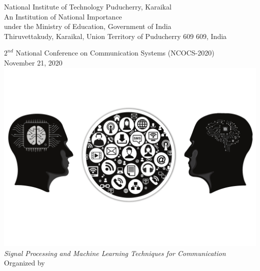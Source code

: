 \documentclass[12pt]{article}
\begin{document}
  

		{
			

	\begin{center}
		\thispagestyle{empty}	
		\onehalfspacing
		{\large National Institute of Technology Puducherry, Karaikal}\\
		{An Institution of National Importance}\\ \vspace{-0.25cm}
		{under the Ministry of Education, Government of India}\\
		{\large  Thiruvettakudy, Karaikal, Union Territory of Puducherry 609 609, India}
	\end{center}
		
	\begin{center}
		{\large $2^{nd}$ National Conference on Communication Systems (NCOCS-2020)}\\
		November 21, 2020\\
		\vspace{0.15cm}
		{\includegraphics[scale=0.16,trim={0cm, 4.5cm, 0cm, 4cm},clip]{conference-logo.pdf}}\\
		\textit{Signal Processing and Machine Learning Techniques for Communication}\\
		\vspace{0.25cm}
		{Organized by}\\
		\vspace{0.15cm}

\end{center}}
\end{document}
